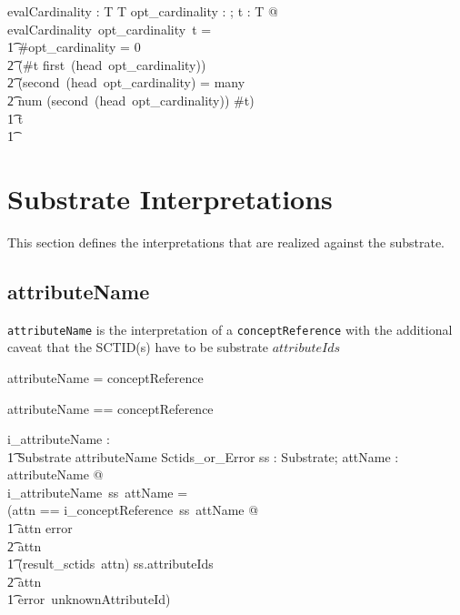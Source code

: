 \documentclass{article}
\def\spec#1{{\tt #1}}
\def\bnf#1{{\scriptsize {{#1}} }}
\begin{document}
\begin{gendef}[T]
   evalCardinality : \optional[cardinality] \fun \power T \fun \power T
\where
   \forall opt\_cardinality : \optional[cardinality]; t : \power T @ \\
evalCardinality~opt\_cardinality~t = \\
\t1 \IF \#opt\_cardinality = 0 \lor \\
\t2 (\#t \geq first~(head~opt\_cardinality)) \land \\
\t2 (second~(head~opt\_cardinality) = many \lor \\
\t2 num \inv (second~(head~opt\_cardinality)) \geq \#t) \\
\t1 \THEN t \\
\t1 \ELSE  \emptyset
\end{gendef}


\section{Substrate Interpretations}
\label{sect:substrate}
This section defines the interpretations that are realized against the substrate. 

\subsection{attributeName}
\spec{attributeName} is the interpretation of a \spec{conceptReference} with the additional caveat that the SCTID(s) have to be substrate $attributeIds$
\begin{framed}
\noindent
\bnf{attributeName = conceptReference}
\end{framed}

\begin{zed}
attributeName == conceptReference
\end{zed}

\begin{gendef}
   i\_attributeName : \\
\t1 Substrate \fun attributeName \fun Sctids\_or\_Error
\where
   \forall ss : Substrate; attName : attributeName @ \\
   i\_attributeName~ss~attName = \\
   (\LET attn == i\_conceptReference~ss~attName @ \\
\t1 \IF attn \in \ran error \\
\t2 \THEN attn \\
\t1 \ELSE \IF (result\_sctids~attn) \subseteq ss.attributeIds \\
\t2 \THEN attn \\
\t1 \ELSE error~unknownAttributeId)
\end{gendef}
\end{document}

